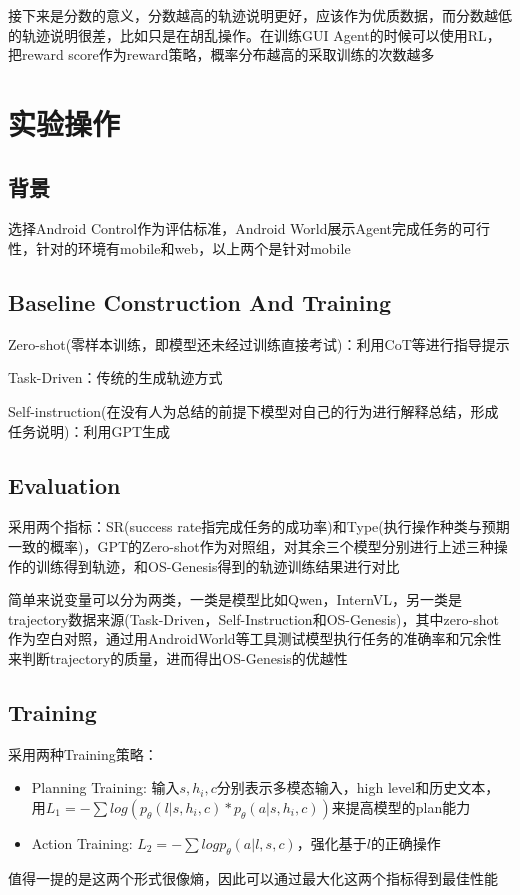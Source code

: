 \documentclass[a4paper,12pt]{article}
\begin{document}
接下来是分数的意义，分数越高的轨迹说明更好，应该作为优质数据，而分数越低的轨迹说明很差，比如只是在胡乱操作。在训练GUI Agent的时候可以使用RL，把reward score作为reward策略，概率分布越高的采取训练的次数越多

\section{实验操作}
\subsection{背景}
选择Android Control作为评估标准，Android World展示Agent完成任务的可行性，针对的环境有mobile和web，以上两个是针对mobile

\subsection{Baseline Construction And Training}
Zero-shot(零样本训练，即模型还未经过训练直接考试)：利用CoT等进行指导提示

Task-Driven：传统的生成轨迹方式

Self-instruction(在没有人为总结的前提下模型对自己的行为进行解释总结，形成任务说明)：利用GPT生成

\subsection{Evaluation}
采用两个指标：SR(success rate指完成任务的成功率)和Type(执行操作种类与预期一致的概率)，GPT的Zero-shot作为对照组，对其余三个模型分别进行上述三种操作的训练得到轨迹，和OS-Genesis得到的轨迹训练结果进行对比

简单来说变量可以分为两类，一类是模型比如Qwen，InternVL，另一类是trajectory数据来源(Task-Driven，Self-Instruction和OS-Genesis)，其中zero-shot作为空白对照，通过用AndroidWorld等工具测试模型执行任务的准确率和冗余性来判断trajectory的质量，进而得出OS-Genesis的优越性

\subsection{Training}
采用两种Training策略：
\begin{itemize}
    \item Planning Training: 输入$s, h_i, c$分别表示多模态输入，high level和历史文本，用$L_1 = -\sum log(p_{\theta}(l|s, h_i, c) * p_{\theta}(a|s, h_i, c))$来提高模型的plan能力
    \item Action Training: $L_2 = -\sum log p_{\theta}(a|l, s, c)$，强化基于$l$的正确操作
\end{itemize}
值得一提的是这两个形式很像熵，因此可以通过最大化这两个指标得到最佳性能
\end{document}
